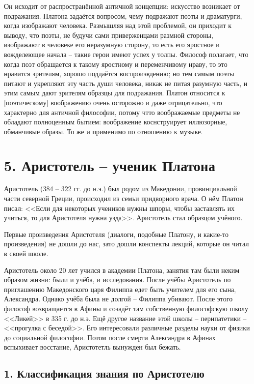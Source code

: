 \documentclass[a4paper, 12pt]{article} %
\begin{document}
Он исходит от распространённой античной концепции: искусство возникает от подражания. Платона задаётся вопросом, чему подражают поэты и драматурги, когда изображают человека. Размышляя над этой проблемой, он приходит к выводу, что поэты, не будучи сами приверженцами размной стороны, изображают в человеке его неразумную сторону, то есть его яростное и вожделеющее начала -- такие герои имеют успех у толпы. Философ полагает, что когда поэт обращается к такому яростному и переменчивому нраву, то это нравится зрителям, хорошо поддаётся воспроизвдению; но тем самым поэты питают и укрепляют эту часть души человека, никак не питая разумную часть, и этим самым дают зрителям образцы для подражания. Платон относится к [поэтическому] воображению очень осторожно и даже отрицательно, что характерно для античной философии, потому чтто воображаемые предметы не обладают полноценным бытием: воображение коснструирует иллюзорные, обманчивые образы.  То же и применимо по отношению к музыке.

\section*{5. Аристотель -- ученик Платона}

Аристотель (384 -- 322 гг. до н.э.) был родом из Македонии, провинциальной части северной Греции, происходил из семьи придворного врача.
О нём Платон писал: <<Если для некоторых учеников нужны шпоры, чтобы заставлять их учиться, то для Аристотеля нужна узда>>. Аристотель стал образцом учёного. 

Первые произведения Аристотеля (диалоги, подобные Платону, и какие-то произведения) не дошли до нас, зато дошли конспекты лекций, которые он читал в своей школе. 

Аристотель около 20 лет учился в академии Платона, занятия там были неким образом жизни: были и учёба, и исследования. После учёбы Аристотель по приглашению Македонского царя Филиппа едет быть учителем для его сына, Александра. Однако учёба была не долгой -- Филиппа убивают. После этого философ возвращается в Афины и созадёт там собственную философскую школу <<Ликей>> в 335 г. до н.э. Ещё другое название этой  школы -- перипатетики -- <<прогулка с беседой>>. Его интересовали различные разделы науки от физики до социальной философии. Потом после смерти Александра в Афинах вспыхивает восстание, Аристотетль вынужден был бежать. 

\subsection*{1. Классификация знания по Аристотелю}
\end{document}
